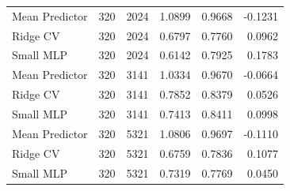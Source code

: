 \begin{table}[htbp]
\begin{tabular}{lrrrrr}
Mean Predictor & 320 & 2024 & 1.0899 & 0.9668 & -0.1231 \\
Ridge CV & 320 & 2024 & 0.6797 & 0.7760 & 0.0962 \\
Small MLP & 320 & 2024 & 0.6142 & 0.7925 & 0.1783 \\
Mean Predictor & 320 & 3141 & 1.0334 & 0.9670 & -0.0664 \\
Ridge CV & 320 & 3141 & 0.7852 & 0.8379 & 0.0526 \\
Small MLP & 320 & 3141 & 0.7413 & 0.8411 & 0.0998 \\
Mean Predictor & 320 & 5321 & 1.0806 & 0.9697 & -0.1110 \\
Ridge CV & 320 & 5321 & 0.6759 & 0.7836 & 0.1077 \\
Small MLP & 320 & 5321 & 0.7319 & 0.7769 & 0.0450 \\
\bottomrule
\end{tabular}
\end{table}
